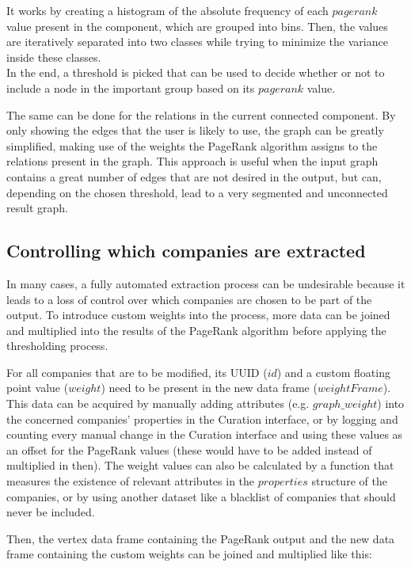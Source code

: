 \documentclass[
        a4paper,     %
        titlepage,   %
        oneside,     %
        parskip      %
]{scrartcl}          %
\begin{document}
  It works by creating a histogram of the absolute frequency of
  each $pagerank$ value present in the component, which are grouped into bins.
  Then, the values are iteratively separated into two classes while trying to
  minimize the variance inside these classes.\\
  In the end, a threshold is picked that can be used to decide whether or not to
  include a node in the important group based on its $pagerank$ value.

  The same can be done for the relations in the current connected component.
  By only showing the edges that the user is likely to use, the graph can be greatly
  simplified, making use of the weights the PageRank algorithm assigns to the
  relations present in the graph. This approach is useful when the input graph
  contains a great number of edges that are not desired in the output, but can,
  depending on the chosen threshold, lead to a very segmented and unconnected result graph.

  \subsection{Controlling which companies are extracted}
  In many cases, a fully automated extraction process can be undesirable because
  it leads to a loss of control over which companies are chosen to be part of the
  output. To introduce custom weights into the process, more data can be joined and multiplied
  into the results of the PageRank algorithm before applying the thresholding process.

  For all companies that are to be modified, its UUID ($id$) and a custom floating point
  value ($weight$) need to be present in the new data frame ($weightFrame$).
  This data can be acquired by manually adding attributes (e.g. $graph\_weight$)
  into the concerned companies' properties in the Curation interface, or by logging and counting
  every manual change in the Curation interface and using these values as an offset for the
  PageRank values (these would have to be added instead of multiplied in then).
  The weight values can also be calculated by a function that measures the existence
  of relevant attributes in the $properties$ structure of the companies, or by
  using another dataset like a blacklist of companies that should never be included.

  Then, the vertex data frame containing the PageRank output and the new
  data frame containing the custom weights can be joined and multiplied like this:
\end{document}
